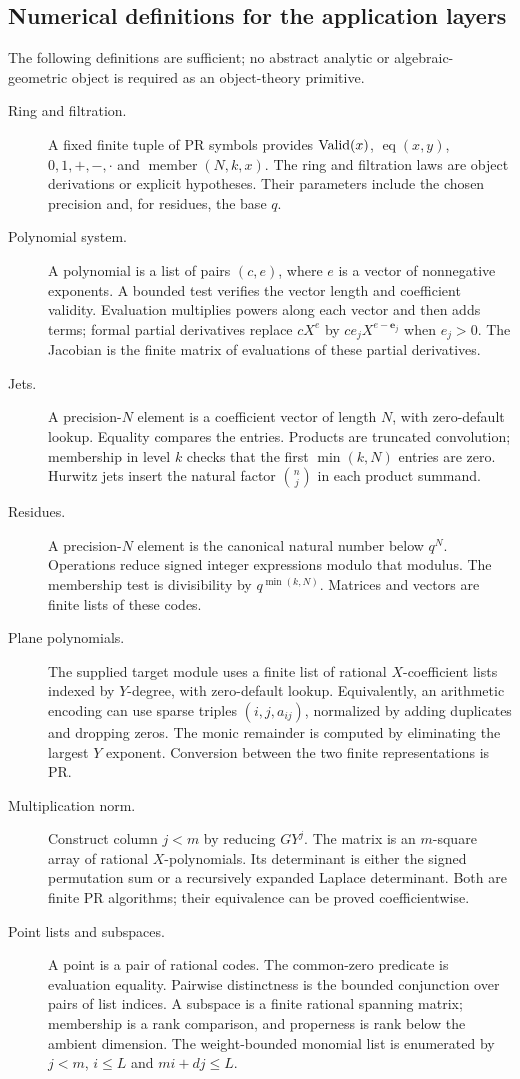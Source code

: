 \subsection{Numerical definitions for the application layers}

The following definitions are sufficient; no abstract analytic or
algebraic-geometric object is required as an object-theory primitive.

\begin{description}
\item[Ring and filtration.] A fixed finite tuple of PR symbols provides
\(\operatorname{Valid}(x)\), \(\operatorname{eq}(x,y)\), \(0,1,+,-,\cdot\) and
\(\operatorname{member}(N,k,x)\). The ring and filtration laws are
object derivations or explicit hypotheses. Their parameters include the
chosen precision and, for residues, the base \(q\).
\item[Polynomial system.] A polynomial is a list of pairs
\((c,e)\), where \(e\) is a vector of nonnegative exponents. A bounded
test verifies the vector length and coefficient validity. Evaluation
multiplies powers along each vector and then adds terms; formal partial
derivatives replace \(cX^e\) by
\(ce_jX^{e-\mathbf e_j}\) when \(e_j>0\). The Jacobian is the finite
matrix of evaluations of these partial derivatives.
\item[Jets.] A precision-\(N\) element is a coefficient vector of length
\(N\), with zero-default lookup. Equality compares the entries. Products
are truncated convolution; membership in level \(k\) checks that the
first \(\min(k,N)\) entries are zero. Hurwitz jets insert the natural
factor \(\binom nj\) in each product summand.
\item[Residues.] A precision-\(N\) element is the canonical natural
number below \(q^N\). Operations reduce signed integer expressions
modulo that modulus. The membership test is divisibility by
\(q^{\min(k,N)}\). Matrices and vectors are finite lists of these codes.
\item[Plane polynomials.] The supplied target module uses a finite list
of rational \(X\)-coefficient lists indexed by \(Y\)-degree, with
zero-default lookup. Equivalently, an arithmetic encoding can use sparse
triples \((i,j,a_{ij})\), normalized by adding duplicates and dropping
zeros. The monic remainder is computed by eliminating the largest
\(Y\) exponent. Conversion between the two finite representations is PR.
\item[Multiplication norm.] Construct column \(j<m\) by reducing
\(GY^j\). The matrix is an \(m\)-square array of rational
\(X\)-polynomials. Its determinant is either the signed permutation sum
or a recursively expanded Laplace determinant. Both are finite PR
algorithms; their equivalence can be proved coefficientwise.
\item[Point lists and subspaces.] A point is a pair of rational codes.
The common-zero predicate is evaluation equality. Pairwise distinctness
is the bounded conjunction over pairs of list indices. A subspace is a
finite rational spanning matrix; membership is a rank comparison, and
properness is rank below the ambient dimension. The weight-bounded
monomial list is enumerated by \(j<m\), \(i\le L\) and \(mi+dj\le L\).
\end{description}


